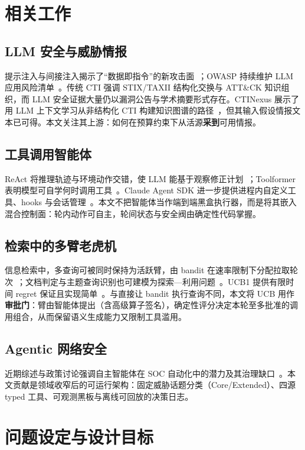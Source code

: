\documentclass[conference]{IEEEtran}
\begin{document}
\section{相关工作}
\label{sec:related}

\subsection{LLM 安全与威胁情报}
提示注入与间接注入揭示了“数据即指令”的新攻击面~\cite{greshake2023injection}；OWASP 持续维护 LLM 应用风险清单~\cite{owasp2025llmtop10}。传统 CTI 强调 STIX/TAXII 结构化交换与 ATT\&CK 知识组织，而 LLM 安全证据大量仍以漏洞公告与学术摘要形式存在。CTINexus 展示了用 LLM 上下文学习从非结构化 CTI 构建知识图谱的路径~\cite{cheng2025ctinexus}，但其输入假设情报文本已可得。本文关注其上游：如何在预算约束下从活源\textbf{采到}可用情报。

\subsection{工具调用智能体}
ReAct 将推理轨迹与环境动作交错，使 LLM 能基于观察修正计划~\cite{yao2023react}；Toolformer 表明模型可自学何时调用工具~\cite{schick2023toolformer}。Claude Agent SDK 进一步提供进程内自定义工具、hooks 与会话管理~\cite{claudeagentsdk,claudeagenthooks}。本文不把智能体当作端到端黑盒执行器，而是将其嵌入混合控制面：轮内动作可自主，轮间状态与安全阀由确定性代码掌握。

\subsection{检索中的多臂老虎机}
信息检索中，多查询可被同时保持为活跃臂，由 bandit 在速率限制下分配拉取轮次~\cite{li2016multiple}；文档判定与主题查询识别也可建模为探索—利用问题~\cite{losada2016feeling,losada2021cost}。UCB1 提供有限时间 regret 保证且实现简单~\cite{auer2002ucb}。与直接让 bandit 执行查询不同，本文将 UCB 用作\textbf{审批门}：臂由智能体提出（含高级算子签名），确定性评分决定本轮至多批准的调用组合，从而保留语义生成能力又限制工具滥用。

\subsection{Agentic 网络安全}
近期综述与政策讨论强调自主智能体在 SOC 自动化中的潜力及其治理缺口~\cite{kshetri2025agentic,lazer2026survey}。本文贡献是领域收窄后的可运行架构：固定威胁话题分类（Core/Extended）、四源 typed 工具、可观测黑板与离线可回放的决策日志。

\section{问题设定与设计目标}
\label{sec:problem}
\end{document}
